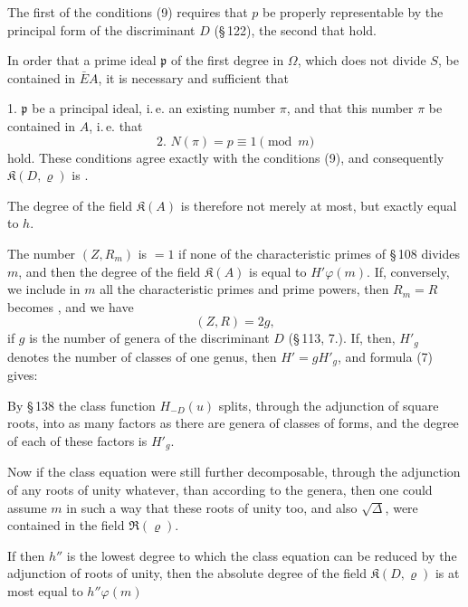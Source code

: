 
The first of the conditions (9) requires that $p$ be properly representable by the principal form of the discriminant $D$ (\S\,122), the second that
hold.

In order that a prime ideal $\mathfrak{p}$ of the first degree in $\Omega$, which does not divide $S$, be contained in $\bar{E}A$, it is necessary and sufficient that

1. $\mathfrak{p}$ be a principal ideal, i.\,e. an existing number $\pi$, and that this number $\pi$ be contained in $A$, i.\,e. that
\[
\text{2. } N(\pi) = p \equiv 1 \pmod{m}
\]
hold. These conditions agree exactly with the conditions (9), and consequently $\mathfrak{K}(D, \varrho)$ is .

The degree of the field $\mathfrak{K}(A)$ is therefore not merely at most, but exactly equal to $h$.

The number $(Z, R_m)$ is $=1$ if none of the characteristic primes of \S\,108 divides $m$, and then the degree of the field $\mathfrak{K}(A)$ is equal to $H'\varphi(m)$. If, conversely, we include in $m$ all the characteristic primes and prime powers, then $R_m = R$ becomes , and we have
\[
(Z, R) = 2g,
\]
if $g$ is the number of genera of the discriminant $D$ (\S\,113, 7.). If, then, $H'_g$ denotes the number of classes of one genus, then $H' = g H'_g$, and formula (7) gives:

By \S\,138 the class function $H_{-D}(u)$ splits, through the adjunction of square roots, into as many factors as there are genera of classes of forms, and the degree of each of these factors is $H'_g$.

Now if the class equation were still further decomposable, through the adjunction of any roots of unity whatever, than according to the genera, then one could assume $m$ in such a way that these roots of unity too, and also $\sqrt{\Delta}$, were contained in the field $\mathfrak{R}(\varrho)$.

If then $h''$ is the lowest degree to which the class equation can be reduced by the adjunction of roots of unity, then the absolute degree of the field $\mathfrak{K}(D, \varrho)$ is at most equal to $h''\varphi(m)$
